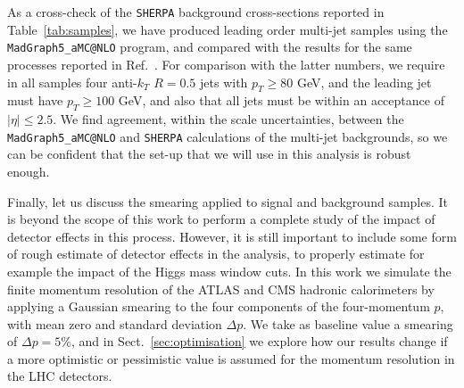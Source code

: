 As a cross-check of the {\tt SHERPA}
background cross-sections reported in Table~\ref{tab:samples}, we have produced leading order
multi-jet samples
using the {\tt MadGraph5\_aMC@NLO} program, and compared with the results for the same processes reported in
Ref.~\cite{Alwall:2014hca}.
%
For comparison with the latter numbers, 
we require in all samples four anti-$k_T$ $R=0.5$ jets with $p_T \ge 80 $ GeV, and the leading jet must have $p_T \ge 100$ GeV, and
also that all jets must be within an acceptance of $|\eta| \le 2.5 $.
%
We find agreement, within the scale uncertainties, between the {\tt MadGraph5\_aMC@NLO} and {\tt SHERPA} calculations of the multi-jet
backgrounds, so we can be confident that the set-up that we will use in this analysis is robust enough.



Finally, let us discuss the smearing applied to signal
and background samples.
%
It is beyond the scope of this work to perform a complete study of the impact of
detector effects in this process.
%
However, it is still important to include some form of rough estimate of detector
effects in the analysis, to properly estimate for example the impact
of the Higgs mass window cuts.
%
In this work we simulate the finite momentum resolution of the ATLAS and CMS
hadronic calorimeters by applying a Gaussian smearing to the four components
of the four-momentum $p$, with mean zero and standard deviation $\Delta p$.
%
We take as baseline value a smearing of $\Delta p=5\%$, and in
Sect.~\ref{sec:optimisation} we explore how our results change
if a more optimistic or pessimistic value is assumed for the momentum
resolution in the LHC detectors.
